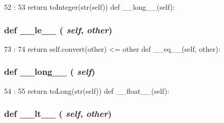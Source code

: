 \begin{DoxyCode}
52                      :
53         return toInteger(str(self))
    def __long__(self):
\end{DoxyCode}
\hypertarget{classm5_1_1util_1_1smartdict_1_1Variable_a83166e4aabc2805e71aef3a43f016181}{
\subsubsection[{\_\-\_\-le\_\-\_\-}]{\setlength{\rightskip}{0pt plus 5cm}def \_\-\_\-le\_\-\_\- ( {\em self}, \/   {\em other})}}
\label{classm5_1_1util_1_1smartdict_1_1Variable_a83166e4aabc2805e71aef3a43f016181}



\begin{DoxyCode}
73                            :
74         return self.convert(other) <= other
    def __eq__(self, other):
\end{DoxyCode}
\hypertarget{classm5_1_1util_1_1smartdict_1_1Variable_a44b0d01b7aeedc4b3c9052a2c6ba1645}{
\subsubsection[{\_\-\_\-long\_\-\_\-}]{\setlength{\rightskip}{0pt plus 5cm}def \_\-\_\-long\_\-\_\- ( {\em self})}}
\label{classm5_1_1util_1_1smartdict_1_1Variable_a44b0d01b7aeedc4b3c9052a2c6ba1645}



\begin{DoxyCode}
54                       :
55         return toLong(str(self))
    def __float__(self):
\end{DoxyCode}
\hypertarget{classm5_1_1util_1_1smartdict_1_1Variable_a6a45920abc8ecf2d458d174ea7304f8a}{
\subsubsection[{\_\-\_\-lt\_\-\_\-}]{\setlength{\rightskip}{0pt plus 5cm}def \_\-\_\-lt\_\-\_\- ( {\em self}, \/   {\em other})}}
\label{classm5_1_1util_1_1smartdict_1_1Variable_a6a45920abc8ecf2d458d174ea7304f8a}



